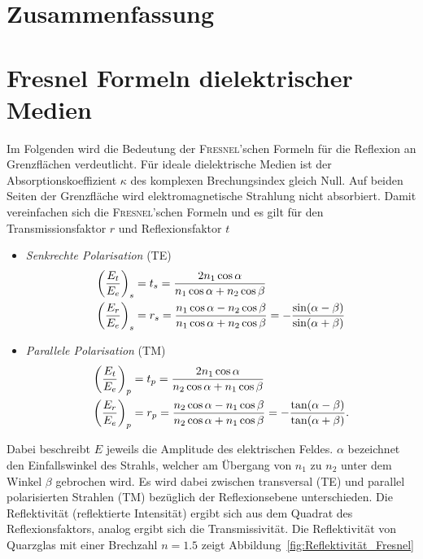 \documentclass[a4paper,twoside,final]{article}
\begin{document}
\section{Zusammenfassung}

\appendix
\section{Fresnel Formeln dielektrischer Medien}
Im Folgenden wird die Bedeutung der \textsc{Fresnel}'schen Formeln für die Reflexion an Grenzflächen verdeutlicht. Für ideale dielektrische Medien ist der Absorptionskoeffizient $\kappa$ des komplexen Brechungsindex gleich Null. Auf beiden Seiten der Grenzfläche wird elektromagnetische Strahlung nicht absorbiert. Damit vereinfachen sich die \textsc{Fresnel}'schen Formeln und es gilt für den Transmissionsfaktor $r$ und Reflexionsfaktor $t$~\cite{Demtroeder2}
\begin{itemize}
  \item \emph{Senkrechte Polarisation} (TE)
  \begin{align}
    \qty(\frac{E_t}{E_e})_s &= t_s = \frac{2 n_1 \cos \alpha}{n_1 \cos\alpha + n_2 \cos \beta}\\
    \qty(\frac{E_r}{E_e})_s &= r_s = \frac{n_1 \cos\alpha - n_2 \cos\beta}{n_1 \cos\alpha + n_2 \cos \beta} = -\frac{\sin(\alpha -\beta)}{\sin(\alpha + \beta)}
  \end{align}
  \item \emph{Parallele Polarisation} (TM)
  \begin{align}
    \qty(\frac{E_t}{E_e})_p &= t_p = \frac{2 n_1 \cos \alpha}{n_2 \cos\alpha + n_1 \cos \beta}\\
    \qty(\frac{E_r}{E_e})_p &= r_p = \frac{n_2 \cos\alpha - n_1 \cos\beta}{n_2 \cos\alpha + n_1 \cos \beta} = -\frac{\tan(\alpha -\beta)}{\tan(\alpha + \beta)}.\label{eqn:Parallele_Polarisation}
  \end{align}
\end{itemize}
Dabei beschreibt $E$ jeweils die Amplitude des elektrischen Feldes. $\alpha$ bezeichnet den Einfallswinkel des Strahls, welcher am Übergang von $n_1$ zu $n_2$ unter dem Winkel $\beta$ gebrochen wird.
Es wird dabei zwischen transversal (TE) und parallel polarisierten Strahlen (TM) bezüglich der Reflexionsebene unterschieden. Die Reflektivität (reflektierte Intensität) ergibt sich aus dem Quadrat des Reflexionsfaktors, analog ergibt sich die Transmissivität. Die Reflektivität von Quarzglas mit einer Brechzahl $n = 1.5$ zeigt Abbildung~\ref{fig:Reflektivität_Fresnel}
\end{document}
